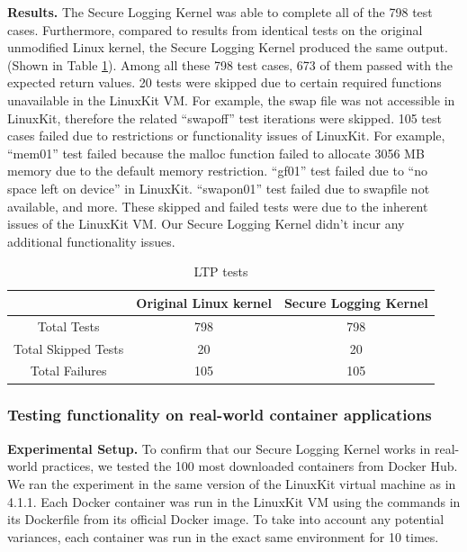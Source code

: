 \textbf{Results.}
The Secure Logging Kernel was able to complete all of the 798 test cases. 
Furthermore, compared to results from identical tests on the original unmodified Linux kernel, the Secure Logging Kernel produced the same output. (Shown in Table \ref{tab:evaluation_ltp_results}).  
Among all these 798 test cases, 673 of them passed with the expected return values. 20 tests were skipped due to certain required functions unavailable in the LinuxKit VM. 
For example, the swap file was not accessible in LinuxKit, therefore the related ``swapoff'' test iterations were skipped. 
105 test cases failed due to restrictions or functionality issues of LinuxKit. 
For example, ``mem01'' test failed because the malloc function failed to allocate 3056 MB memory due to the default memory restriction. 
``gf01'' test failed due to ``no space left on device'' in LinuxKit. ``swapon01'' test failed due to swapfile not available, and more. 
These skipped and failed tests were due to the inherent issues of the LinuxKit VM. Our Secure Logging Kernel didn't incur any additional functionality issues.  

\begin{table}[h!]
\begin{center}
\caption{LTP tests}
\label{tab:evaluation_ltp_results}
\begin{tabular}{c|c|c}
 & Original Linux kernel & Secure Logging Kernel \\
 \hline
 Total Tests & 798 & 798 \\
 \hline
 Total Skipped Tests & 20 & 20 \\
 \hline
 Total Failures & 105 & 105 \\ 
\end{tabular}
\end{center}
\end{table}

\subsubsection{Testing functionality on real-world container applications}
\label{sec.evaluation.functionality.containers} 
\textbf{Experimental Setup.}
To confirm that our Secure Logging Kernel works in real-world practices, we tested the 100 most downloaded containers from Docker Hub. 
We ran the experiment in the same version of the LinuxKit virtual machine as in 4.1.1. 
Each Docker container was run in the LinuxKit VM using the commands in its Dockerfile from its official Docker image. 
To take into account any potential variances, each container was run in the exact same environment for 10 times. 

